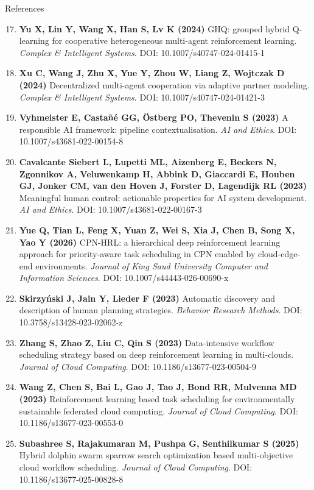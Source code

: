 \begin{frame}{References}
\scriptsize
{}
\begin{enumerate}\setcounter{enumi}{16}\itemsep0.22em\leftskip=-0.55em
\item \textbf{Yu X, Lin Y, Wang X, Han S, Lv K (2024)} GHQ: grouped hybrid Q-learning for cooperative heterogeneous multi-agent reinforcement learning. \textit{Complex \& Intelligent Systems}. DOI: 10.1007/s40747-024-01415-1
\item \textbf{Xu C, Wang J, Zhu X, Yue Y, Zhou W, Liang Z, Wojtczak D (2024)} Decentralized multi-agent cooperation via adaptive partner modeling. \textit{Complex \& Intelligent Systems}. DOI: 10.1007/s40747-024-01421-3
\item \textbf{Vyhmeister E, Casta\~n\'e GG, \"Ostberg PO, Thevenin S (2023)} A responsible AI framework: pipeline contextualisation. \textit{AI and Ethics}. DOI: 10.1007/s43681-022-00154-8
\item \textbf{Cavalcante Siebert L, Lupetti ML, Aizenberg E, Beckers N, Zgonnikov A, Veluwenkamp H, Abbink D, Giaccardi E, Houben GJ, Jonker CM, van den Hoven J, Forster D, Lagendijk RL (2023)} Meaningful human control: actionable properties for AI system development. \textit{AI and Ethics}. DOI: 10.1007/s43681-022-00167-3
\item \textbf{Yue Q, Tian L, Feng X, Yuan Z, Wei S, Xia J, Chen B, Song X, Yao Y (2026)} CPN-HRL: a hierarchical deep reinforcement learning approach for priority-aware task scheduling in CPN enabled by cloud-edge-end environments. \textit{Journal of King Saud University Computer and Information Sciences}. DOI: 10.1007/s44443-026-00690-x
\item \textbf{Skirzy\'{n}ski J, Jain Y, Lieder F (2023)} Automatic discovery and description of human planning strategies. \textit{Behavior Research Methods}. DOI: 10.3758/s13428-023-02062-z
\item \textbf{Zhang S, Zhao Z, Liu C, Qin S (2023)} Data-intensive workflow scheduling strategy based on deep reinforcement learning in multi-clouds. \textit{Journal of Cloud Computing}. DOI: 10.1186/s13677-023-00504-9
\item \textbf{Wang Z, Chen S, Bai L, Gao J, Tao J, Bond RR, Mulvenna MD (2023)} Reinforcement learning based task scheduling for environmentally sustainable federated cloud computing. \textit{Journal of Cloud Computing}. DOI: 10.1186/s13677-023-00553-0
\item \textbf{Subashree S, Rajakumaran M, Pushpa G, Senthilkumar S (2025)} Hybrid dolphin swarm sparrow search optimization based multi-objective cloud workflow scheduling. \textit{Journal of Cloud Computing}. DOI: 10.1186/s13677-025-00828-8
\end{enumerate}
\end{frame}


